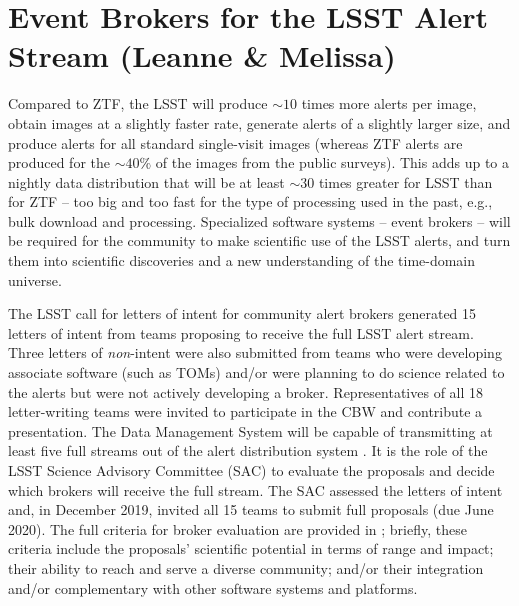 \section{Event Brokers for the LSST Alert Stream (Leanne \& Melissa)} \label{sec:lsstbrokers}


Compared to ZTF, the LSST will produce $\sim10$ times more alerts per image, obtain images at a slightly faster rate, generate alerts of a slightly larger size, and produce alerts for all standard single-visit images (whereas ZTF alerts are produced for the $\sim40\%$ of the images from the public surveys).
This adds up to a nightly data distribution that will be at least $\sim30$ times greater for LSST than for ZTF -- too big and too fast for the type of processing used in the past, e.g., bulk download and processing.
Specialized software systems -- event brokers -- will be required for the community to make scientific use of the LSST alerts, and turn them into scientific discoveries and a new understanding of the time-domain universe.

The LSST call for letters of intent for community alert brokers \citep{LDM-682} generated 15 letters of intent from teams proposing to receive the full LSST alert stream.
Three letters of {\it non}-intent were also submitted from teams who were developing associate software (such as TOMs) and/or were planning to do science related to the alerts but were not actively developing a broker.
Representatives of all 18 letter-writing teams were invited to participate in the CBW and contribute a presentation.
The Data Management System will be capable of transmitting at least five full streams out of the alert distribution system \citep{LSE-61}.
It is the role of the LSST Science Advisory Committee (SAC) to evaluate the proposals and decide which brokers will receive the full stream.
The SAC assessed the letters of intent and, in December 2019, invited all 15 teams to submit full proposals (due June 2020).
The full criteria for broker evaluation are provided in \citet{LDM-612}; briefly, these criteria include the proposals' scientific potential in terms of range and impact; their ability to reach and serve a diverse community; and/or their integration and/or complementary with other software systems and platforms. 


